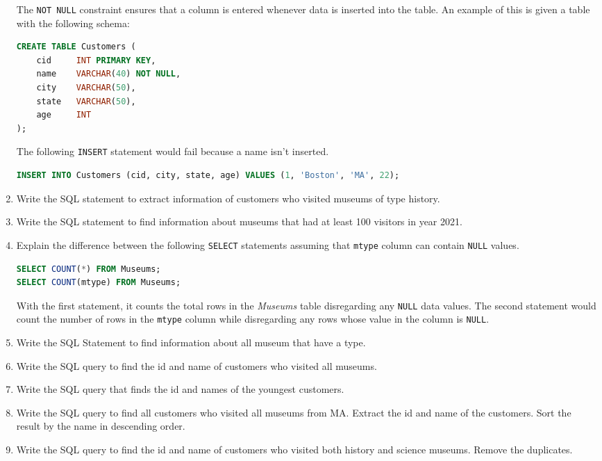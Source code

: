 \documentclass[letterpaper, 11pt]{article}
\begin{document}
\begin{enumerate}[leftmargin=*]
    The \texttt{NOT NULL} constraint ensures that a column is entered whenever data is inserted into the table. An example of this is given a table with the following schema:
    \begin{tcolorbox}
    \begin{lstlisting}[language=SQL]
CREATE TABLE Customers (
    cid     INT PRIMARY KEY,
    name    VARCHAR(40) NOT NULL,
    city    VARCHAR(50),
    state   VARCHAR(50),
    age     INT
);
    \end{lstlisting}
    \end{tcolorbox}
    The following \texttt{INSERT} statement would fail because a name isn't inserted.
    \begin{tcolorbox}
    \begin{lstlisting}[language=SQL]
INSERT INTO Customers (cid, city, state, age) VALUES (1, 'Boston', 'MA', 22);
    \end{lstlisting}
    \end{tcolorbox}
    \item Write the SQL statement to extract information of customers who visited museums of type history.
    \item Write the SQL statement to find information about museums that had at least 100 visitors in year 2021.
    \item Explain the difference between the following \texttt{SELECT} statements assuming that \texttt{mtype} column can contain \texttt{NULL} values.
    \begin{tcolorbox}
    \begin{lstlisting}[language=SQL]
SELECT COUNT(*) FROM Museums;
SELECT COUNT(mtype) FROM Museums;
    \end{lstlisting}
    \end{tcolorbox}
    With the first statement, it counts the total rows in the \textit{Museums} table disregarding any \texttt{NULL} data values. The second statement would count the number of rows in the \texttt{mtype} column while disregarding any rows whose value in the column is \texttt{NULL}.
    \item Write the SQL Statement to find information about all museum that have a type.
    \item Write the SQL query to find the id and name of customers who visited all museums.
    \item Write the SQL query that finds the id and names of the youngest customers.
    \item Write the SQL query to find all customers who visited all museums from MA. Extract the id and name of the customers. Sort the result by the name in descending order.
    \item Write the SQL query to find the id and name of customers who visited both history and science museums. Remove the duplicates. 
\end{enumerate}
\end{document}
